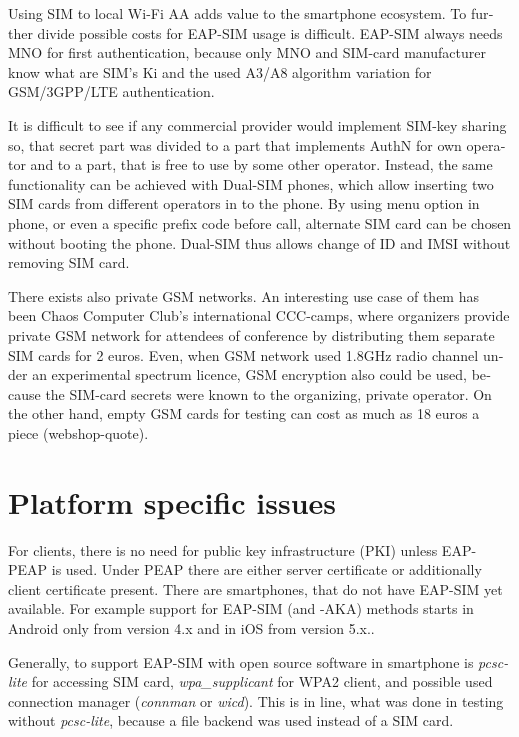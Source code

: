 \documentclass[12pt,a4paper,english]{tutthesis}
\begin{document}
\begin{otherlanguage}{english}
Using SIM to local Wi-Fi AA adds value to the smartphone ecosystem.
To further divide possible costs for EAP-SIM usage
is difficult.
EAP-SIM always needs MNO for first authentication,
because only MNO and SIM-card manufacturer know 
what are SIM's Ki and the used A3/A8 algorithm variation
for GSM/3GPP/LTE authentication.

It is difficult to see if any commercial provider would implement
SIM-key sharing so, that secret part was divided to a part that
implements AuthN for own operator and to a part, that is free to use by
some other operator.  Instead, the same functionality can be achieved with
Dual-SIM phones, which allow inserting two SIM cards from different
operators in to the phone. By using menu option in phone, or even a
specific prefix code before call, alternate SIM card can be chosen
without booting the phone.
Dual-SIM thus allows change of ID and IMSI without removing SIM card.

There exists also private GSM networks. An interesting use case
of them  has been Chaos Computer Club's international 
CCC-camps\cite{ccc}, where organizers 
provide private GSM network for attendees of conference
by distributing them separate SIM cards for 2 euros.  Even, when GSM
network used 1.8GHz radio channel under an experimental spectrum
licence,  GSM encryption also could be used, because the SIM-card secrets were known
to the organizing, private operator.
On the other hand, empty GSM cards for testing can cost as much as 
18 euros a piece (webshop-quote\cite{smartjac-testsim}).


\section{Platform specific issues}
\label{sec-6-3}

For clients, there is no need for public key infrastructure (PKI) 
unless EAP-PEAP is used. Under PEAP there are either server
certificate or additionally client certificate present.
There are smartphones, that do not have EAP-SIM yet available.
For example support for
EAP-SIM (and -AKA) methods starts in Android only from version 4.x and in
iOS from version 5.x.\cite{sim-support}.


Generally, to support EAP-SIM  with open source software in 
smartphone is \emph{pcsc-lite} for accessing SIM card, \emph{wpa\_supplicant} for
WPA2 client, and possible used connection manager (\emph{connman} or
\emph{wicd}). This is in line, what was done in testing without \emph{pcsc-lite},
because a file backend was used instead of a SIM card.






\end{otherlanguage}
\end{document}
